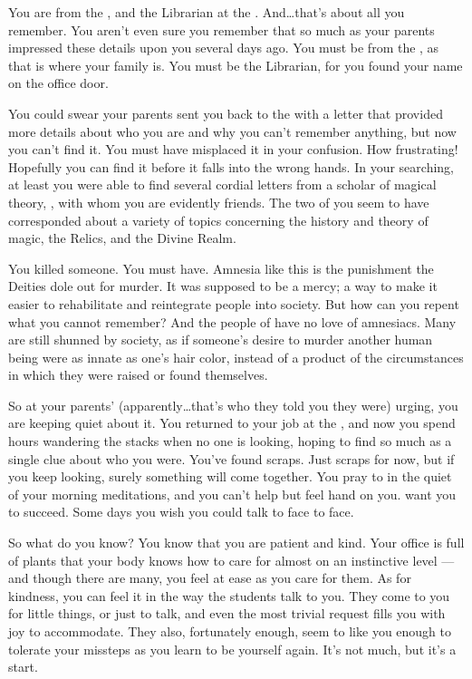 \documentclass[char]{GL2020}
\begin{document}
\name{\cLibrarian{}}

You are \cLibrarian{\intro} from the \pTech{}, and the Librarian at the \pSchool{}. And\ldots that's about all you remember. You aren't even sure you remember that so much as your parents impressed these details upon you several days ago. You must be from the \pTech{}, as that is where your family is. You must be the Librarian, for you found your name on the office door. 

You could swear your parents sent you back to the \pSchool{} with a letter that provided more details about who you are and why you can’t remember anything, but now you can’t find it. You must have misplaced it in your confusion. How frustrating! Hopefully you can find it before it falls into the wrong hands. In your searching, at least you were able to find several cordial letters from a scholar of magical theory, \cWildCard{\full}, with whom you are evidently friends. The two of you seem to have corresponded about a variety of topics concerning the history and theory of magic, the Relics, and the Divine Realm.

You killed someone. You must have. Amnesia like this is the punishment the Deities dole out for murder. It was supposed to be a mercy; a way to make it easier to rehabilitate and reintegrate people into society. But how can you repent what you cannot remember? And the people of \pEarth{} have no love of amnesiacs. Many are still shunned by society, as if someone's desire to murder another human being were as innate as one's hair color, instead of a product of the circumstances in which they were raised or found themselves.

So at your parents’ (apparently\ldots that’s who they told you they were) urging, you are keeping quiet about it. You returned to your job at the \pSchool{}, and now you spend hours wandering the stacks when no one is looking, hoping to find so much as a single clue about who you were. You've found scraps. Just scraps for now, but if you keep looking, surely something will come together. You pray to \cTechGod{} in the quiet of your morning meditations, and you can't help but feel \cTechGod{\their} hand on you. \cTechGod{\They} want\cTechGod{\verbs} you to succeed. Some days you wish you could talk to \cTechGod{\them} face to face.

So what do you know? You know that you are patient and kind. Your office is full of plants that your body knows how to care for almost on an instinctive level — and though there are many, you feel at ease as you care for them. As for kindness, you can feel it in the way the students talk to you. They come to you for little things, or just to talk, and even the most trivial request fills you with joy to accommodate. They also, fortunately enough, seem to like you enough to tolerate your missteps as you learn to be yourself again. It's not much, but it's a start.
\end{document}

